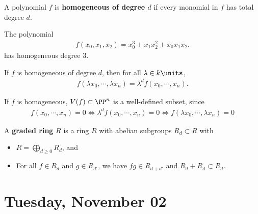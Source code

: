 \begin{definition}

A polynomial \(f\) is \textbf{homogeneous of degree \(d\)} if every
monomial in \(f\) has total degree \(d\).

\end{definition}

\begin{example}[?]

The polynomial
\begin{align*}  
f(x_0, x_1, x_2) = x_0^3 + x_1 x_2^2 + x_0 x_1 x_2
.\end{align*} has homogeneous degree 3.

\end{example}

\begin{remark}

If \(f\) is homogeneous of degree \(d\), then for all
\(\lambda \in k\units\),
\begin{align*}  
f(\lambda x_0, \cdots, \lambda x_n) = \lambda^d f(x_0, \cdots, x_n)
.\end{align*}

If \(f\) is homogeneous, \(V(f) \subset \PP^n\) is a well-defined
subset, since
\begin{align*}
f(x_0, \cdots, x_n) = 0 \iff \lambda^d f(x_0, \cdots, x_n) = 0 \iff f(\lambda x_0, \cdots, \lambda x_n) = 0
\end{align*}

\end{remark}

\begin{definition}

A \textbf{graded ring} \(R\) is a ring \(R\) with abelian subgroups
\(R_d \subset R\) with

\begin{itemize}
\tightlist
\item
  \(R = \bigoplus_{d\geq 0} R_d\), and
\item
  For all \(f\in R_d\) and \(g\in R_{d'}\), we have \(fg \in R_{d+d'}\)
  and \(R_d + R_{d} \subset R_d\).
\end{itemize}

\end{definition}

\hypertarget{tuesday-november-02}{%
\section{Tuesday, November 02}\label{tuesday-november-02}}


